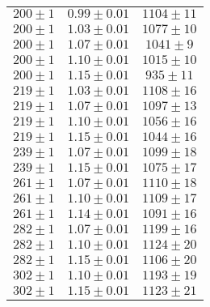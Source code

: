 \begin{figure}[h!]
\begin{minipage}{0.49\textwidth}
\begin{tabular}{ccc}
\midrule
$200	\pm 1 $	 	&	$0.99 \pm 0.01 $	&	$1104 \pm 	11$	\\
$200	\pm 1 $		&	$1.03 \pm 0.01 $	&	$1077 \pm 	10$	\\
$200	\pm 1 $		&	$1.07 \pm 0.01 $	&	$1041 \pm 	9$	\\
$200	\pm 1 $		&	$1.10 \pm 0.01 $	&	$1015 \pm 	10$	\\
$200	\pm 1 $		&	$1.15 \pm 0.01 $	&	$935 \pm  	11$	\\
$219	\pm 1 $		&	$1.03 \pm 0.01 $	&	$1108 \pm 	16$	\\
$219	\pm 1 $		&	$1.07 \pm 0.01 $	&	$1097 \pm 	13$	\\
$219	\pm 1 $		&	$1.10 \pm 0.01 $	&	$1056 \pm 	16$	\\
$219	\pm 1 $		&	$1.15 \pm 0.01 $	&	$1044 \pm 	16$	\\
$239	\pm 1 $		&	$1.07 \pm 0.01 $	&	$1099 \pm 	18$	\\
$239	\pm 1 $		&	$1.15 \pm 0.01 $	&	$1075 \pm 	17$	\\
$261	\pm 1 $		&	$1.07 \pm 0.01 $	&	$1110 \pm 	18$	\\
$261	\pm 1 $		&	$1.10 \pm 0.01 $	&	$1109 \pm 	17$	\\
$261	\pm 1 $		&	$1.14 \pm 0.01 $	&	$1091 \pm 	16$	\\
$282	\pm 1 $		&	$1.07 \pm 0.01 $	&	$1199 \pm 	16$	\\
$282	\pm 1 $		&	$1.10 \pm 0.01 $	&	$1124 \pm 	20$	\\
$282	\pm 1 $		&	$1.15 \pm 0.01 $	&	$1106 \pm 	20$	\\
$302	\pm 1 $		&	$1.10 \pm 0.01 $	&	$1193 \pm 	19$	\\
$302	\pm 1 $		&	$1.15 \pm 0.01 $	&	$1123 \pm 	21$	\\
\bottomrule
\end{tabular}
\label{dati_raggi}
\end{minipage}

\end{figure}
